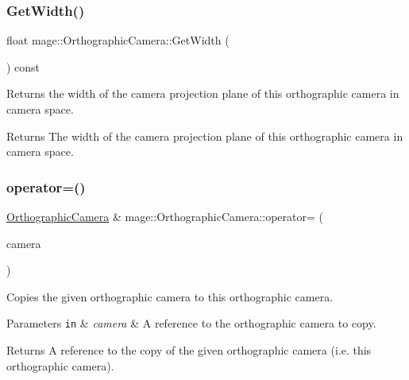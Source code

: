 \subsubsection{\texorpdfstring{Get\+Width()}{GetWidth()}}
{\footnotesize\ttfamily float mage\+::\+Orthographic\+Camera\+::\+Get\+Width (\begin{DoxyParamCaption}{ }\end{DoxyParamCaption}) const}

Returns the width of the camera projection plane of this orthographic camera in camera space.

\begin{DoxyReturn}{Returns}
The width of the camera projection plane of this orthographic camera in camera space. 
\end{DoxyReturn}
\hypertarget{classmage_1_1_orthographic_camera_ac4a319517ed3b9708028e555660b23aa}{}\label{classmage_1_1_orthographic_camera_ac4a319517ed3b9708028e555660b23aa} 
\subsubsection{\texorpdfstring{operator=()}{operator=()}\hspace{0.1cm}{\footnotesize\ttfamily [1/2]}}
{\footnotesize\ttfamily \hyperlink{classmage_1_1_orthographic_camera}{Orthographic\+Camera} \& mage\+::\+Orthographic\+Camera\+::operator= (\begin{DoxyParamCaption}\item[{const \hyperlink{classmage_1_1_orthographic_camera}{Orthographic\+Camera} \&}]{camera }\end{DoxyParamCaption})\hspace{0.3cm}{\ttfamily [default]}}

Copies the given orthographic camera to this orthographic camera.


\begin{DoxyParams}[1]{Parameters}
\mbox{\tt in}  & {\em camera} & A reference to the orthographic camera to copy. \\
\hline
\end{DoxyParams}
\begin{DoxyReturn}{Returns}
A reference to the copy of the given orthographic camera (i.\+e. this orthographic camera). 
\end{DoxyReturn}
\hypertarget{classmage_1_1_orthographic_camera_a7fc303921e07ae18dd6fb7e9b7812847}{}\label{classmage_1_1_orthographic_camera_a7fc303921e07ae18dd6fb7e9b7812847} 
